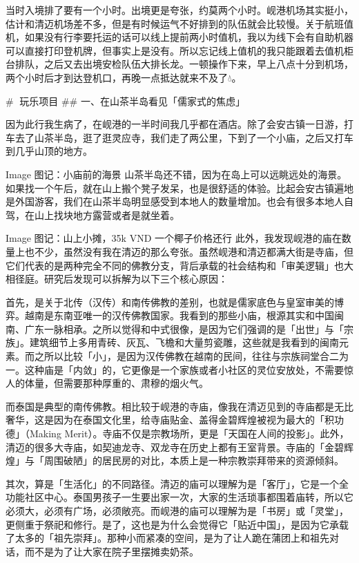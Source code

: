 当时入境排了要有一个小时。出境更是夸张，约莫两个小时。岘港机场其实挺小，估计和清迈机场差不多，但是有时候运气不好排到的队伍就会比较慢。关于航班值机，如果没有行李要托运的话可以线上提前两小时值机，我以为线下会有自助机器可以直接打印登机牌，但事实上是没有。所以忘记线上值机的我只能跟着去值机柜台排队，之后又去出境安检队伍大排长龙。一顿操作下来，早上八点十分到机场，两个小时后才到达登机口，再晚一点抵达就来不及了💧。

# 🌱玩乐项目
## 一、在山茶半岛看见「儒家式的焦虑」

因为此行我生病了，在岘港的一半时间我几乎都在酒店。除了会安古镇一日游，打车去了山茶半岛，逛了逛灵应寺，我们走了两公里，下到了一个小庙，之后又打车到几乎山顶的地方。

Image
图记：小庙前的海景
山茶半岛还不错，因为在岛上可以远眺远处的海景。如果找一个午后，就在山上搬个凳子发呆，也是很舒适的体验。比起会安古镇遍地是外国游客，我们在山茶半岛明显感受到本地人的数量增加。也会有很多本地人自驾，在山上找块地方露营或者是就坐着。

Image
图记：山上小摊，35k VND 一个椰子价格还行
此外，我发现岘港的庙在数量上也不少，虽然没有我在清迈的那么夸张。虽然岘港和清迈都满大街是寺庙，但它们代表的是两种完全不同的佛教分支，背后承载的社会结构和「审美逻辑」也大相径庭。研究后发现可以拆解为以下三个核心原因：

首先，是关于北传（汉传）和南传佛教的差别，也就是儒家底色与皇室审美的博弈。越南是东南亚唯一的汉传佛教国家。我看到的那些小庙，根源其实和中国闽南、广东一脉相承。之所以觉得和中式很像，是因为它们强调的是「出世」与「宗族」。建筑细节上多用青砖、灰瓦、飞檐和大量剪瓷雕，这些就是我看到的闽南元素。而之所以比较「小」，是因为汉传佛教在越南的民间，往往与宗族祠堂合二为一。这种庙是「内敛」的，它更像是一个家族或者小社区的灵位安放处，不需要惊人的体量，但需要那种厚重的、肃穆的烟火气。

而泰国是典型的南传佛教。相比较于岘港的寺庙，像我在清迈见到的寺庙都是无比奢华，这是因为在泰国文化里，给寺庙贴金、盖得金碧辉煌被视为最大的「积功德」（Making Merit）。寺庙不仅是宗教场所，更是「天国在人间的投影」。此外，清迈的很多大寺庙，如契迪龙寺、双龙寺在历史上都有王室背景。寺庙的「金碧辉煌」与「周围破陋」的居民房的对比，本质上是一种宗教崇拜带来的资源倾斜。

其次，算是「生活化」的不同路径。清迈的庙可以理解为是「客厅」，它是一个全功能社区中心。泰国男孩子一生要出家一次，大家的生活琐事都围着庙转，所以它必须大，必须有广场，必须敞亮。而岘港的庙可以理解为是「书房」或「灵堂」，更侧重于祭祀和修行。是了，这也是为什么会觉得它「贴近中国」，是因为它承载了太多的「祖先崇拜」。那种小而紧凑的空间，是为了让人跪在蒲团上和祖先对话，而不是为了让大家在院子里摆摊卖奶茶。

